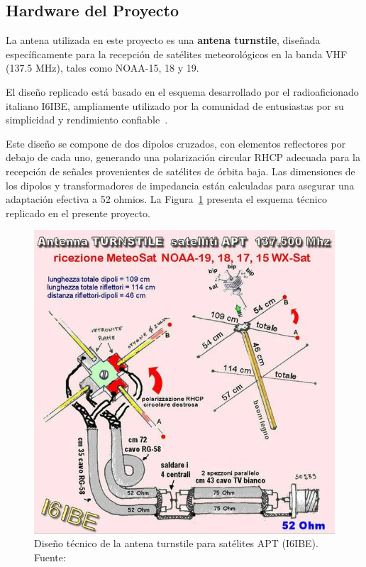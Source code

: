 \documentclass[conference]{IEEEtran}
\begin{document}
\subsection{Hardware del Proyecto}

La antena utilizada en este proyecto es una \textbf{antena turnstile}, diseñada específicamente para la recepción de satélites meteorológicos en la banda VHF (137.5 MHz), tales como NOAA-15, 18 y 19. 

El diseño replicado está basado en el esquema desarrollado por el radioaficionado italiano I6IBE, ampliamente utilizado por la comunidad de entusiastas por su simplicidad y rendimiento confiable~\cite{i6ibe_turnstile}. 

Este diseño se compone de dos dipolos cruzados, con elementos reflectores por debajo de cada uno, generando una polarización circular RHCP adecuada para la recepción de señales provenientes de satélites de órbita baja. Las dimensiones de los dipolos y transformadores de impedancia están calculadas para asegurar una adaptación efectiva a 52 ohmios. La Figura~\ref{fig:antena_i6ibe} presenta el esquema técnico replicado en el presente proyecto.

\begin{figure}[H]
\centering
\includegraphics[width=0.95\linewidth]{figs/turnstile_i6ibe.png}
\caption{Diseño técnico de la antena turnstile para satélites APT (I6IBE). Fuente:~\cite{i6ibe_turnstile}}
\label{fig:antena_i6ibe}
\end{figure}
\end{document}
